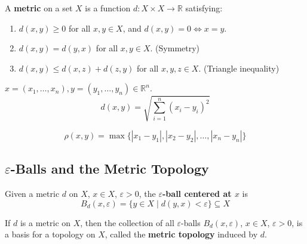 \documentclass[11pt]{report}
\begin{document}
\begin{defbox}[Metric]
A \textbf{metric} on a set $X$ is a function $d: X \times X \to \mathbb{R}$ satisfying:
\begin{enumerate}
    \item $d(x, y) \geq 0$ for all $x, y \in X$, and $d(x, y) = 0 \Leftrightarrow x = y$.
    \item $d(x, y) = d(y, x)$ for all $x, y \in X$. (Symmetry)
    \item $d(x, y) \leq d(x, z) + d(z, y)$ for all $x, y, z \in X$. (Triangle inequality)
\end{enumerate}
\end{defbox}

\begin{exbox}
$x = (x_1, \ldots, x_n), y = (y_1, \ldots, y_n) \in \mathbb{R}^n$.
\[d(x, y) = \sqrt{\sum_{i=1}^{n} (x_i - y_i)^2}\]
\end{exbox}

\begin{exbox}
\[\rho(x, y) = \max\{|x_1 - y_1|, |x_2 - y_2|, \ldots, |x_n - y_n|\}\]
\end{exbox}

\subsection{$\varepsilon$-Balls and the Metric Topology}

\begin{defbox}
Given a metric $d$ on $X$, $x \in X$, $\varepsilon > 0$, the \textbf{$\varepsilon$-ball centered at $x$} is
\[B_d(x, \varepsilon) = \{y \in X \mid d(y, x) < \varepsilon\} \subseteq X\]
\end{defbox}

\begin{defbox}
If $d$ is a metric on $X$, then the collection of all $\varepsilon$-balls $B_d(x, \varepsilon)$, $x \in X$, $\varepsilon > 0$, is a basis for a topology on $X$, called the \textbf{metric topology} induced by $d$.
\end{defbox}
\end{document}
